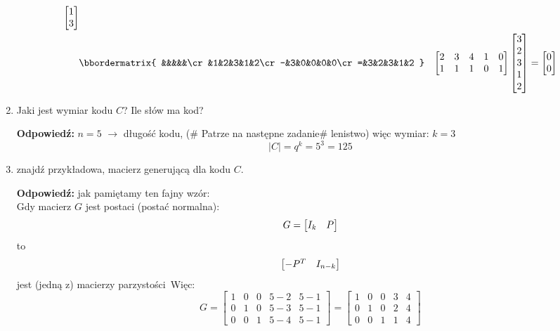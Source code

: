 \begin{enumerate}[label=\alph*)]
\begin{align*}
\begin{bmatrix}
1\\3
\end{bmatrix}\\
&\bbordermatrix{
&&&&&\cr
&1&2&3&1&2\cr
-&3&0&0&0&0\cr
=&3&2&3&1&2
}&\begin{bmatrix}
2& 3& 4& 1& 0\\
1& 1& 1& 0& 1 
\end{bmatrix}\begin{bmatrix}
3\\ 2\\ 3\\ 1\\ 2
\end{bmatrix}=\begin{bmatrix}
0\\0
\end{bmatrix}
\end{align*}
\item Jaki jest wymiar kodu $C$? Ile słów ma kod?

\textbf{Odpowiedź: }$n=5$ $\rightarrow$ długość kodu, (\# Patrze na następne zadanie\# lenistwo) więc wymiar: $k=3$
$$|C|=q^k=5^3=125$$
\item znajdź przykładowa, macierz generującą dla kodu $C$.

\textbf{Odpowiedź:} jak pamiętamy ten fajny wzór:\\
Gdy macierz $G$ jest postaci (postać normalna):
$$G=\begin{bmatrix}
{\Huge I_k}& {\Huge P}
\end{bmatrix}$$
to
$$\begin{bmatrix}
{\Huge -P^T} & {\Huge I_{n-k}}
\end{bmatrix}$$ jest (jedną z) macierzy parzystości\
Więc: $$G=\begin{bmatrix}
1 & 0 & 0 & 5-2 & 5-1\\
0 & 1 & 0 & 5-3 & 5-1\\
0 & 0 & 1 & 5-4 & 5-1
\end{bmatrix}=\begin{bmatrix}
1 & 0 & 0 & 3 & 4\\
0 & 1 & 0 & 2 & 4\\
0 & 0 & 1 & 1 & 4
\end{bmatrix}$$
\end{enumerate}

